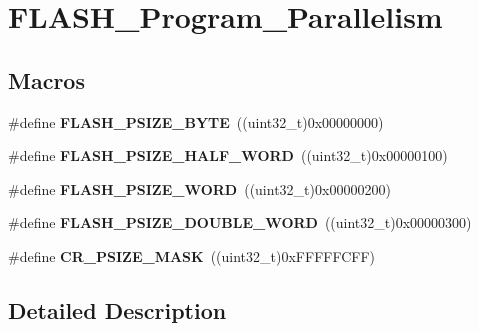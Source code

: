 \hypertarget{group___f_l_a_s_h___program___parallelism}{\section{F\-L\-A\-S\-H\-\_\-\-Program\-\_\-\-Parallelism}
\label{group___f_l_a_s_h___program___parallelism}
}
\subsection*{Macros}
\begin{DoxyCompactItemize}
\item 
\hypertarget{group___f_l_a_s_h___program___parallelism_ga83c67710aa697216193654e1e90cc953}{\#define {\bfseries F\-L\-A\-S\-H\-\_\-\-P\-S\-I\-Z\-E\-\_\-\-B\-Y\-T\-E}~((uint32\-\_\-t)0x00000000)}\label{group___f_l_a_s_h___program___parallelism_ga83c67710aa697216193654e1e90cc953}

\item 
\hypertarget{group___f_l_a_s_h___program___parallelism_gad3210ba7423b45cb3063f4294cdeab16}{\#define {\bfseries F\-L\-A\-S\-H\-\_\-\-P\-S\-I\-Z\-E\-\_\-\-H\-A\-L\-F\-\_\-\-W\-O\-R\-D}~((uint32\-\_\-t)0x00000100)}\label{group___f_l_a_s_h___program___parallelism_gad3210ba7423b45cb3063f4294cdeab16}

\item 
\hypertarget{group___f_l_a_s_h___program___parallelism_gac3ac337ed43efc869a9f734527e44673}{\#define {\bfseries F\-L\-A\-S\-H\-\_\-\-P\-S\-I\-Z\-E\-\_\-\-W\-O\-R\-D}~((uint32\-\_\-t)0x00000200)}\label{group___f_l_a_s_h___program___parallelism_gac3ac337ed43efc869a9f734527e44673}

\item 
\hypertarget{group___f_l_a_s_h___program___parallelism_ga0fd17c4e281f199f09a6a6365e9243ee}{\#define {\bfseries F\-L\-A\-S\-H\-\_\-\-P\-S\-I\-Z\-E\-\_\-\-D\-O\-U\-B\-L\-E\-\_\-\-W\-O\-R\-D}~((uint32\-\_\-t)0x00000300)}\label{group___f_l_a_s_h___program___parallelism_ga0fd17c4e281f199f09a6a6365e9243ee}

\item 
\hypertarget{group___f_l_a_s_h___program___parallelism_ga7c755f15e36221021a1438857e40365c}{\#define {\bfseries C\-R\-\_\-\-P\-S\-I\-Z\-E\-\_\-\-M\-A\-S\-K}~((uint32\-\_\-t)0x\-F\-F\-F\-F\-F\-C\-F\-F)}\label{group___f_l_a_s_h___program___parallelism_ga7c755f15e36221021a1438857e40365c}

\end{DoxyCompactItemize}


\subsection{Detailed Description}
